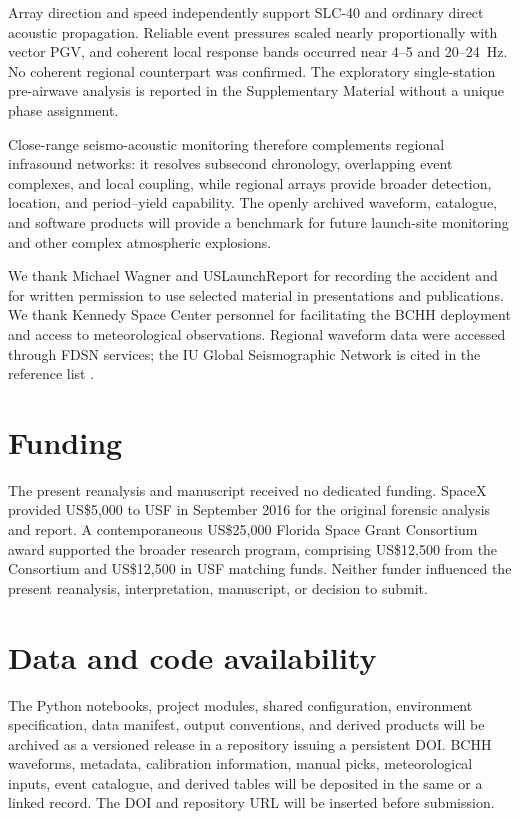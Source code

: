 \documentclass[]{seismica}
\begin{document}
Array direction and speed independently support SLC-40 and ordinary direct
acoustic propagation. Reliable event pressures scaled nearly proportionally
with vector PGV, and coherent local response bands occurred near 4--5 and
20--24~Hz. No coherent regional counterpart was confirmed. The exploratory
single-station pre-airwave analysis is reported in the Supplementary Material
without a unique phase assignment.

Close-range seismo-acoustic monitoring therefore complements regional
infrasound networks: it resolves subsecond chronology, overlapping event
complexes, and local coupling, while regional arrays provide broader detection,
location, and period--yield capability. The openly archived waveform,
catalogue, and software products will provide a benchmark for future
launch-site monitoring and other complex atmospheric explosions.

\begin{acknowledgements}
We thank Michael Wagner and USLaunchReport for recording the accident and for
written permission to use selected material in presentations and publications.
We thank Kennedy Space Center personnel for facilitating the BCHH deployment
and access to meteorological observations. Regional waveform data were
accessed through FDSN services; the IU Global Seismographic Network is cited
in the reference list \citep{asl_gsn_iu_1988}.
\end{acknowledgements}

\section*{Funding}

The present reanalysis and manuscript received no dedicated funding. SpaceX
provided US\$5,000 to USF in September 2016 for the original forensic analysis
and report. A contemporaneous US\$25,000 Florida Space Grant Consortium award
supported the broader research program, comprising US\$12,500 from the
Consortium and US\$12,500 in USF matching funds. Neither funder influenced the
present reanalysis, interpretation, manuscript, or decision to submit.

\section*{Data and code availability}

The Python notebooks, project modules, shared configuration, environment
specification, data manifest, output conventions, and derived products will be
archived as a versioned release in a repository issuing a persistent DOI. BCHH
waveforms, metadata, calibration information, manual picks, meteorological
inputs, event catalogue, and derived tables will be deposited in the same or a
linked record. The DOI and repository URL will be inserted before submission.
\end{document}
